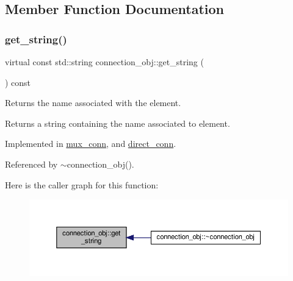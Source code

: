 \subsection{Member Function Documentation}
\mbox{\label{classconnection__obj_a9d68f6173578ed258c9a6477b2e4b408}} 
\subsubsection{\texorpdfstring{get\+\_\+string()}{get\_string()}}
{\footnotesize\ttfamily virtual const std\+::string connection\+\_\+obj\+::get\+\_\+string (\begin{DoxyParamCaption}{ }\end{DoxyParamCaption}) const\hspace{0.3cm}{\ttfamily [pure virtual]}}



Returns the name associated with the element. 

\begin{DoxyReturn}{Returns}
a string containing the name associated to element. 
\end{DoxyReturn}


Implemented in \hyperlink{classmux__conn_ad3ca34b3bb987ccde2bfbf099473514d}{mux\+\_\+conn}, and \hyperlink{classdirect__conn_a4c6df2aa88c8c522a1aee042ff58a0c3}{direct\+\_\+conn}.



Referenced by $\sim$connection\+\_\+obj().

Here is the caller graph for this function\+:
\nopagebreak
\begin{figure}[H]
\begin{center}
\leavevmode
\includegraphics[width=350pt]{dd/d92/classconnection__obj_a9d68f6173578ed258c9a6477b2e4b408_icgraph}
\end{center}
\end{figure}
\mbox{\label{classconnection__obj_a4d228e61318777705dcbdb481c5e1dba}} 
